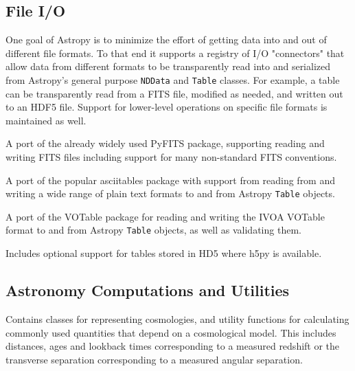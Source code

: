 \documentclass[11pt,twoside]{article}
\begin{document}
\subsection{File I/O}

One goal of Astropy is to minimize the effort of getting data into and out of
different file formats.  To that end it supports a registry of I/O "connectors"
that allow data from different formats to be transparently read into and
serialized from Astropy's general purpose \texttt{NDData} and \texttt{Table}
classes.  For example, a table can be transparently read from a FITS file,
modified as needed, and written out to an HDF5 file.  Support for lower-level
operations on specific file formats is maintained as well.


A port of the already widely used PyFITS package, supporting reading and
writing FITS files including support for many non-standard FITS conventions.


A port of the popular asciitables package with support from reading from and
writing a wide range of plain text formats to and from Astropy \texttt{Table}
objects.


A port of the VOTable package for reading and writing the IVOA VOTable format
to and from Astropy \texttt{Table} objects, as well as validating them.


Includes optional support for tables stored in HD5 where h5py is available.

\subsection{Astronomy Computations and Utilities}


Contains classes for representing cosmologies, and utility functions for
calculating commonly used quantities that depend on a cosmological model.  This
includes distances, ages and lookback times corresponding to a measured
redshift or the transverse separation corresponding to a measured angular
separation.

\end{document}
